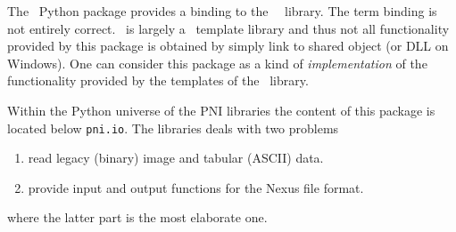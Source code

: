 
The \pypniio\ Python package provides a binding to the \pniio\ \cpp\ library.
The term binding is not entirely correct. \pniio\ is largely a \cpp\ template
library and thus not all functionality provided by this package is obtained by
simply link to shared object (or DLL on Windows). 
One can consider this package as a kind of \emph{implementation} of the
functionality provided by the templates of the \pniio\ library.

Within the Python universe of the PNI libraries the content of this package is
located below \texttt{pni.io}. The libraries deals with two problems 
\begin{enumerate}
\item read legacy (binary) image and tabular (ASCII) data.
\item provide input and output functions for the Nexus file format. 
\end{enumerate}
where the latter part is the most elaborate one. 


